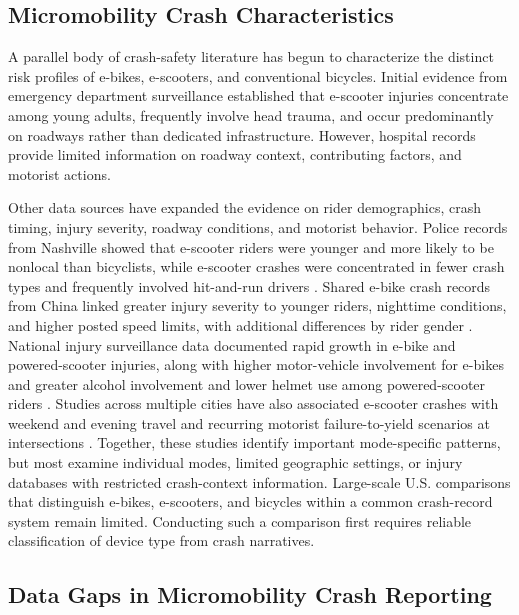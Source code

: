 \documentclass[numbered]{trbunofficial}
\begin{document}
\subsection{Micromobility Crash Characteristics}

A parallel body of crash-safety literature has begun to
characterize the distinct risk profiles of e-bikes,
e-scooters, and conventional bicycles. Initial evidence from
emergency department surveillance \citep{Badeau2019,
Trivedi2020} established that e-scooter injuries concentrate
among young adults, frequently involve head trauma, and occur
predominantly on roadways rather than dedicated
infrastructure. However, hospital records provide limited information on roadway context, contributing factors, and motorist actions.

Other data sources have expanded the evidence on rider demographics, crash timing, injury severity, roadway conditions, and motorist behavior. Police records from Nashville showed that e-scooter riders were younger and more likely to be nonlocal than bicyclists, while e-scooter crashes were concentrated in fewer crash types and frequently involved hit-and-run drivers \citep{Shah2021}. Shared e-bike crash records from China linked greater injury severity to younger riders, nighttime conditions, and higher posted speed limits, with additional differences by rider gender \citep{Zhou2025}. National injury surveillance data documented rapid growth in e-bike and powered-scooter injuries, along with higher motor-vehicle involvement for e-bikes and greater alcohol involvement and lower helmet use among powered-scooter riders \citep{Burford2024}. Studies across multiple cities have also associated e-scooter crashes with weekend and evening travel and recurring motorist failure-to-yield scenarios at intersections \citep{Mwambeleko2022}. Together, these studies identify important mode-specific patterns, but most examine individual modes, limited geographic settings, or injury databases with restricted crash-context information. Large-scale U.S. comparisons that distinguish e-bikes, e-scooters, and bicycles within a common crash-record system remain limited. Conducting such a comparison first requires reliable classification of device type from crash narratives.

\subsection{Data Gaps in Micromobility Crash Reporting}
\end{document}
